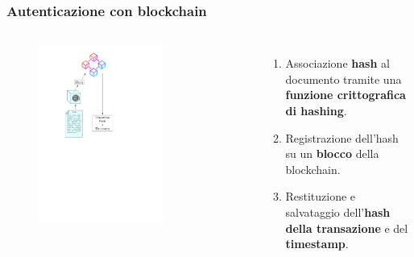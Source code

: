 \documentclass{beamer}
\begin{document}
\begin{frame}
	\frametitle{Autenticazione con blockchain}
	\begin{columns}
		\begin{figure}
			\includegraphics[width=0.7\textwidth]{figures/hashsaving.pdf}
		\end{figure}
		\begin{enumerate}
			\item Associazione \textbf{hash} al documento tramite una \textbf{funzione crittografica di hashing}.
			\item Registrazione dell'hash su un \textbf{blocco} della blockchain.
			\item Restituzione e salvataggio dell'\textbf{hash della transazione} e del \textbf{timestamp}.
		\end{enumerate}
	\end{columns}
\end{frame}
\end{document}
